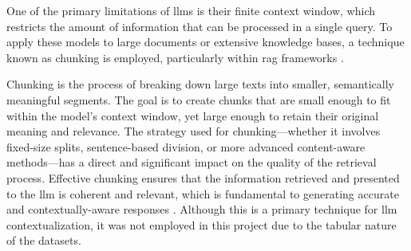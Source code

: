One of the primary limitations of \acp{llm} is their finite context window, which restricts the amount of information that can be processed in a single query. To apply these models to large documents or extensive knowledge bases, a technique known as chunking is employed, particularly within \ac{rag} frameworks \cite{SOTA-RAG-SURVEY}.

Chunking is the process of breaking down large texts into smaller, semantically meaningful segments. The goal is to create chunks that are small enough to fit within the model's context window, yet large enough to retain their original meaning and relevance. The strategy used for chunking---whether it involves fixed-size splits, sentence-based division, or more advanced content-aware methods---has a direct and significant impact on the quality of the retrieval process. Effective chunking ensures that the information retrieved and presented to the \ac{llm} is coherent and relevant, which is fundamental to generating accurate and contextually-aware responses \cite{SOTA-ADVANCED-RAG}. Although this is a primary technique for \acs{llm} contextualization, it was not employed in this project due to the tabular nature of the datasets.